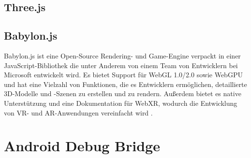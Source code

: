 \subsection{Three.js}


\subsection{Babylon.js}

Babylon.js ist eine Open-Source Rendering- und Game-Engine verpackt in einer JavaScript-Bibliothek die unter Anderem von einem Team von Entwicklern bei Microsoft entwickelt wird.
Es bietet Support für WebGL 1.0/2.0 sowie WebGPU und hat eine Vielzahl von Funktionen, die es Entwicklern ermöglichen, detaillierte 3D-Modelle und -Szenen zu erstellen und zu rendern.
Außerdem bietet es native Unterstützung und eine Dokumentation für WebXR, wodurch die Entwicklung von VR- und AR-Anwendungen vereinfacht wird \autocite[][]{babylon-features}.


\section{Android Debug Bridge}